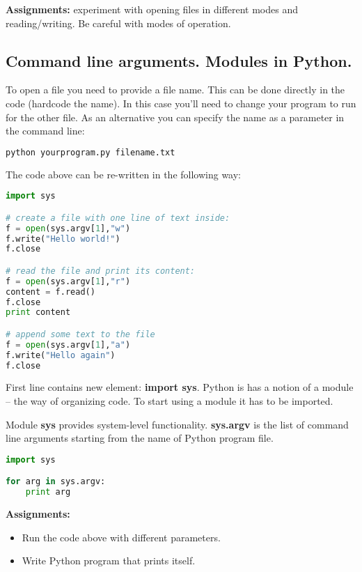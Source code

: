 \begin{tcolorbox}
\textbf{Assignments:}
experiment with opening files in different modes
and reading/writing. Be careful with modes of operation.
\end{tcolorbox}

\subsection{Command line arguments. Modules in Python.}

To open a file you need to provide a file name. This can be done
directly in the code (hardcode the name). In this case you'll need to change
your program to run for the other file. As an alternative you can
specify the name as a parameter in the command line:

\begin{lstlisting}[language=bash,frame=single]
python yourprogram.py filename.txt
\end{lstlisting}

The code above can be re-written in the following way:

\begin{lstlisting}[language=Python,style=codelst,caption={Command line parameter}]
import sys

# create a file with one line of text inside:
f = open(sys.argv[1],"w")
f.write("Hello world!")
f.close

# read the file and print its content:
f = open(sys.argv[1],"r")
content = f.read()
f.close
print content

# append some text to the file
f = open(sys.argv[1],"a")
f.write("Hello again")
f.close

\end{lstlisting}

First line contains new element: \textbf{import sys}.
Python is has a notion of a module -- the way of organizing
code. To start using a module it has to be imported.

Module \textbf{sys} provides system-level functionality.
\textbf{sys.argv} is the list of command line arguments starting
from the name of Python program file.

\begin{lstlisting}[language=Python,style=codelst2,caption={Python: print command line arguments}]
import sys

for arg in sys.argv:
    print arg
\end{lstlisting}

\begin{tcolorbox}
\textbf{Assignments:}
\begin{itemize}
\item Run the code above with different parameters.
\item Write Python program that prints itself.
\end{itemize}
\end{tcolorbox}


